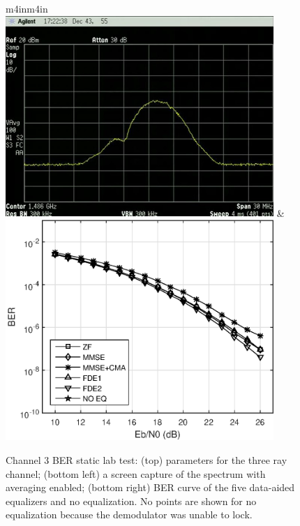 \begin{figure}
\begin{center}
\begin{tabular}{m{4in}m{4in}}
\\[54pt]
\includegraphics[width=4in]{figures/eq_GPUimplementation/BER3.jpg}
&
\includegraphics[width=4in]{figures/eq_GPUimplementation/BER3.eps}
\end{tabular}
\end{center}
\caption{Channel 3 BER static lab test:
(top) parameters for the three ray channel;
(bottom left) a screen capture of the spectrum with averaging enabled;
(bottom right) BER curve of the five data-aided equalizers and no equalization.
No points are shown for no equalization because the demodulator was unable to lock.}
\label{fig:BER3}
\end{figure}